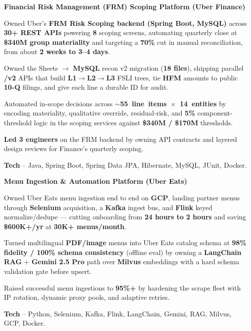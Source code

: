 \textcolor{Project}{\textbf{Financial Risk Management (FRM) Scoping Platform (Uber Finance)}}
\vspace{-1ex}
\begin{zitemize}
    \item Owned Uber's \textbf{FRM Risk Scoping backend (Spring Boot, MySQL)} across \textbf{30+ REST APIs} powering \textbf{8} scoping screens, automating quarterly close at \textbf{\$340M group materiality} and targeting a \textbf{70\%} cut in manual reconciliation, from about \textbf{2 weeks to 3--4 days}.
    \item Owned the Sheets $\rightarrow$ \textbf{MySQL} recon v2 migration (\textbf{18 files}), shipping parallel \textbf{/v2} APIs that build \textbf{L1$\rightarrow$L2$\rightarrow$L3} FSLI trees, tie \textbf{HFM} amounts to public \textbf{10-Q} filings, and give each line a durable ID for audit.
    \item Automated in-scope decisions across \mbox{\textbf{$\sim$55 line items $\times$ 14 entities}} by encoding materiality, qualitative override, residual-risk, and \textbf{5\%} component-threshold logic in the scoping services against \textbf{\$340M / \$170M} thresholds.
    \item \textbf{Led 3 engineers} on the FRM backend by owning API contracts and layered design reviews for Finance's quarterly scoping.
    \item \textbf{Tech} -- Java, Spring Boot, Spring Data JPA, Hibernate, MySQL, JUnit, Docker.
\end{zitemize}
\vspace{0.3ex}

\textcolor{Project}{\textbf{Menu Ingestion \& Automation Platform (Uber Eats)}}
\vspace{-1ex}
\begin{zitemize}
    \item Owned Uber Eats menu ingestion end to end on \textbf{GCP}, landing partner menus through \textbf{Selenium} acquisition, a \textbf{Kafka} ingest bus, and \textbf{Flink} keyed normalize/dedupe --- cutting onboarding from \textbf{24 hours to 2 hours} and saving \textbf{\$600K+/yr} at \textbf{30K+ menus/month}.
    \item Turned multilingual \textbf{PDF/image} menus into Uber Eats catalog schema at \textbf{98\% fidelity / 100\% schema consistency} (offline eval) by owning a \textbf{LangChain RAG} + \textbf{Gemini 2.5 Pro} path over \textbf{Milvus} embeddings with a hard schema validation gate before upsert.
    \item Raised successful menu ingestions to \textbf{95\%+} by hardening the scrape fleet with IP rotation, dynamic proxy pools, and adaptive retries.
    \item \textbf{Tech} -- Python, Selenium, Kafka, Flink, LangChain, Gemini, RAG, Milvus, GCP, Docker.
\end{zitemize}
\vspace{0.15ex}


